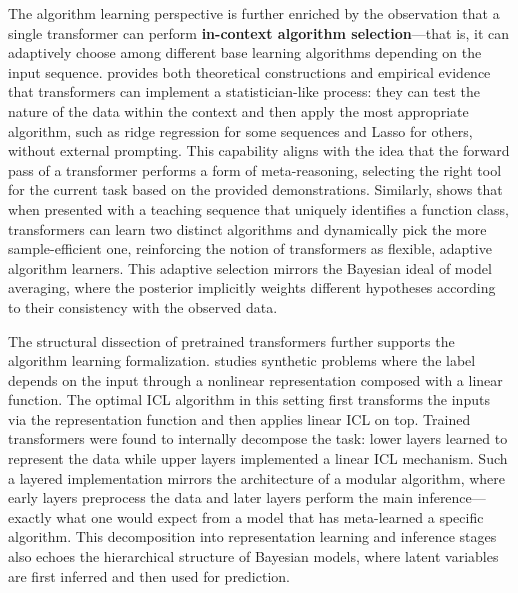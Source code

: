 \documentclass[11pt]{article}
\begin{document}
The algorithm learning perspective is further enriched by the observation that a single transformer can perform \textbf{in-context algorithm selection}---that is, it can adaptively choose among different base learning algorithms depending on the input sequence. \cite{ref7} provides both theoretical constructions and empirical evidence that transformers can implement a statistician-like process: they can test the nature of the data within the context and then apply the most appropriate algorithm, such as ridge regression for some sequences and Lasso for others, without external prompting. This capability aligns with the idea that the forward pass of a transformer performs a form of meta-reasoning, selecting the right tool for the current task based on the provided demonstrations. Similarly, \cite{ref8} shows that when presented with a teaching sequence that uniquely identifies a function class, transformers can learn two distinct algorithms and dynamically pick the more sample-efficient one, reinforcing the notion of transformers as flexible, adaptive algorithm learners. This adaptive selection mirrors the Bayesian ideal of model averaging, where the posterior implicitly weights different hypotheses according to their consistency with the observed data.

The structural dissection of pretrained transformers further supports the algorithm learning formalization. \cite{ref9} studies synthetic problems where the label depends on the input through a nonlinear representation composed with a linear function. The optimal ICL algorithm in this setting first transforms the inputs via the representation function and then applies linear ICL on top. Trained transformers were found to internally decompose the task: lower layers learned to represent the data while upper layers implemented a linear ICL mechanism. Such a layered implementation mirrors the architecture of a modular algorithm, where early layers preprocess the data and later layers perform the main inference---exactly what one would expect from a model that has meta-learned a specific algorithm. This decomposition into representation learning and inference stages also echoes the hierarchical structure of Bayesian models, where latent variables are first inferred and then used for prediction.
\end{document}
